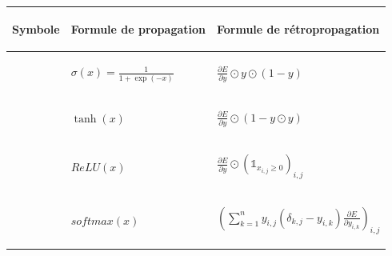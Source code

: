 \begin{center}
\begin{tabular}{|m{3.5cm}|m{2.9cm}|m{5.2cm}|}
\hline
\begin{center}Symbole\end{center} & \begin{center}Formule de propagation\end{center} & \begin{center}Formule de rétropropagation\end{center} \\
\hline
\begin{center}\end{center} & \begin{center}$\sigma(x) = \frac{1}{1 + \exp(-x)}$\end{center} & \begin{center}$\frac{\partial E}{\partial y} \odot y \odot (1 - y)$\end{center} \\
\hline
\begin{center}\end{center} & \begin{center}$\tanh(x)$\end{center} & \begin{center}$\frac{\partial E}{\partial y} \odot (1 - y \odot y)$\end{center} \\ 
\hline
\begin{center}\end{center} & \begin{center}$ReLU(x)$\end{center} & \begin{center}$\frac{\partial E}{\partial y} \odot (\mathds{1}_{x_{i,j} \geq 0})_{i,j}$\end{center} \\ 
\hline
\begin{center}\end{center} & \begin{center}$softmax(x)$\end{center} & \begin{center}$\left(\sum_{k = 1}^{n}{y_{i,j}(\delta_{k,j} - y_{i,k})\frac{\partial E}{\partial y_{i, k}}}\right)_{i,j}$\end{center} \\ 

\end{tabular}
\end{center}
